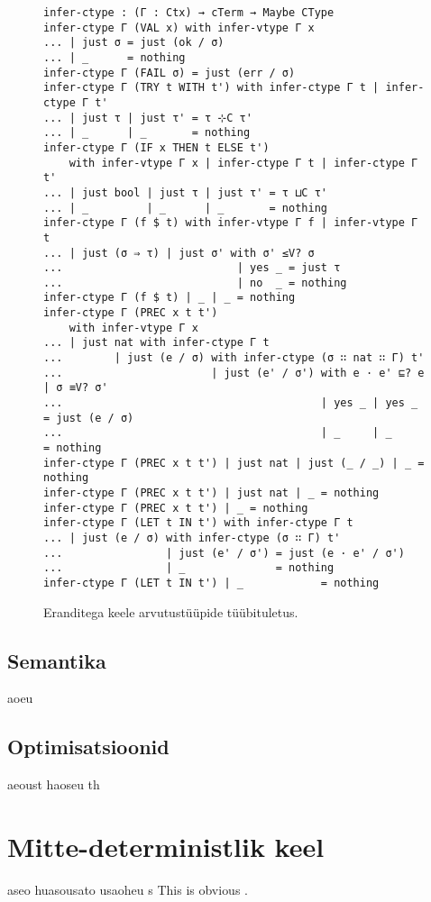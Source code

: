 \documentclass[a4paper,12pt]{article}
\begin{document}
\begin{figure}
  \begin{verbatim}
infer-ctype : (Γ : Ctx) → cTerm → Maybe CType
infer-ctype Γ (VAL x) with infer-vtype Γ x
... | just σ = just (ok / σ)
... | _      = nothing
infer-ctype Γ (FAIL σ) = just (err / σ)
infer-ctype Γ (TRY t WITH t') with infer-ctype Γ t | infer-ctype Γ t'
... | just τ | just τ' = τ ⊹C τ'
... | _      | _       = nothing
infer-ctype Γ (IF x THEN t ELSE t')
    with infer-vtype Γ x | infer-ctype Γ t | infer-ctype Γ t'
... | just bool | just τ | just τ' = τ ⊔C τ'
... | _         | _      | _       = nothing
infer-ctype Γ (f $ t) with infer-vtype Γ f | infer-vtype Γ t
... | just (σ ⇒ τ) | just σ' with σ' ≤V? σ
...                           | yes _ = just τ
...                           | no  _ = nothing
infer-ctype Γ (f $ t) | _ | _ = nothing
infer-ctype Γ (PREC x t t')
    with infer-vtype Γ x
... | just nat with infer-ctype Γ t
...        | just (e / σ) with infer-ctype (σ ∷ nat ∷ Γ) t'
...                       | just (e' / σ') with e · e' ⊑? e | σ ≡V? σ'
...                                        | yes _ | yes _ = just (e / σ)
...                                        | _     | _     = nothing
infer-ctype Γ (PREC x t t') | just nat | just (_ / _) | _ = nothing
infer-ctype Γ (PREC x t t') | just nat | _ = nothing
infer-ctype Γ (PREC x t t') | _ = nothing
infer-ctype Γ (LET t IN t') with infer-ctype Γ t 
... | just (e / σ) with infer-ctype (σ ∷ Γ) t'
...                | just (e' / σ') = just (e · e' / σ')
...                | _              = nothing
infer-ctype Γ (LET t IN t') | _            = nothing\end{verbatim}
  \caption{Eranditega keele arvutustüüpide tüübituletus.}
  \label{fig:exc.infer-ctype}
\end{figure}


\subsection{Semantika}\label{ssec:exc.semantics}
aoeu
\subsection{Optimisatsioonid}\label{ssec:exc.optimizations}
aeoust haoseu th

\clearpage

\section{Mitte-deterministlik keel}
aseo huasousato usaoheu s
This is obvious \cite{Benton2016}. \cite{Katsumata2014}
\end{document}
